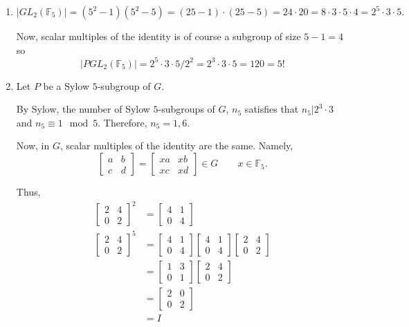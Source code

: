 \documentclass[12pt]{Qual}
\begin{document}
\begin{solution}$\,$
\begin{enumerate}[label=(\alph*)]
    \item $$|GL_2(\mathbb{F}_5)|=(5^2-1)(5^2-5)=(25-1)\cdot(25-5)=24\cdot 20=8\cdot 3\cdot 5\cdot 4=2^5\cdot3\cdot 5.$$

    Now, scalar multiples of the identity is of course a subgroup of size $5-1=4$ so $$|PGL_2(\mathbb{F}_5)|=2^5\cdot3\cdot 5/2^2=2^3\cdot3\cdot 5=120=5!$$

    \item Let $P$ be a Sylow $5$-subgroup of $G$.

    By Sylow, the number of Sylow $5$-subgroups of $G$, $n_5$ satisfies that $n_5|2^3\cdot3$ and $n_5\equiv 1\mod 5$. Therefore, $n_5=1,6.$

    Now, in $G$, scalar multiples of the identity are the same. Namely,  $$\begin{bmatrix}
    a & b\\
    c & d
    \end{bmatrix}=\begin{bmatrix}
    xa & xb\\
    xc & xd
    \end{bmatrix}\in G\qquad x\in \mathbb{F}_5.$$

    Thus, \begin{align*}
    \begin{bmatrix}
    2 & 4\\
    0 & 2
    \end{bmatrix}^2&=\begin{bmatrix}
    4 & 1\\
    0 & 4
    \end{bmatrix}\\
    \begin{bmatrix}
    2 & 4\\
    0 & 2
    \end{bmatrix}^5&=\begin{bmatrix}
    4 & 1\\
    0 & 4
    \end{bmatrix}\begin{bmatrix}
    4 & 1\\
    0 & 4
    \end{bmatrix}\begin{bmatrix}
    2 & 4\\
    0 & 2
    \end{bmatrix}\\
    &=\begin{bmatrix}
    1 & 3\\
    0 & 1
    \end{bmatrix}\begin{bmatrix}
    2 & 4\\
    0 & 2
    \end{bmatrix}\\
    &=\begin{bmatrix}
    2 & 0\\
    0 & 2
    \end{bmatrix}\\
    &=I
    \end{align*}


\end{enumerate}
\end{solution}
\end{document}
